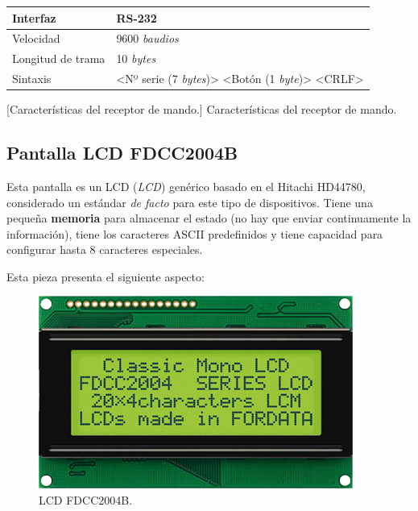 \smallskip

\begin{center}
	\begin{tabular}{|l|l|}
		\hline Interfaz & RS-232 \\
		\hline Velocidad & 9600 \textit{baudios} \\ 
		\hline Longitud de trama & 10 \textit{bytes} \\ 
		\hline Sintaxis & <Nº serie (7 \textit{bytes})> <Botón (1 \textit{byte})> <CRLF> \\ 
		\hline 
	\end{tabular}
	\smallskip
	[Características del receptor de mando.]{\label{tab:info_recv} Características del receptor de mando. \cite{datasheet_decoder}}
\end{center}

\smallskip

\subsection{Pantalla LCD FDCC2004B}

Esta pantalla es un \acrshort{LCD} (\textit{\acrlong{LCD}}) genérico basado en el Hitachi HD44780, considerado un estándar \textit{de facto} para este tipo de dispositivos. Tiene una pequeña \textbf{memoria} para almacenar el estado (no hay que enviar continuamente la información), tiene los caracteres \acrshort{ASCII} predefinidos y tiene capacidad para configurar hasta 8 caracteres especiales.

Esta pieza presenta el siguiente aspecto:

\smallskip

\begin{figure}[H]
	\noindent \begin{centering}
		\includegraphics[width=\linewidth/2]{capitulo3/FDCC2004B}
		\par\end{centering}
	\smallskip
	\caption{\label{fig:FDCC2004B} LCD FDCC2004B.}
\end{figure} 

